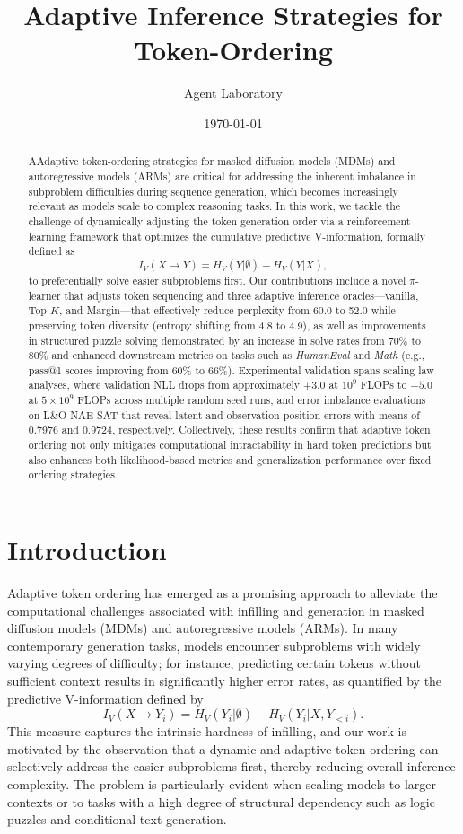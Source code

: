 \documentclass{article} %
\title{Adaptive Inference Strategies for Token-Ordering}
\author{Agent Laboratory}
\date{\today}
\begin{document}
\maketitle

\begin{abstract}
AAdaptive token-ordering strategies for masked diffusion models (MDMs) and autoregressive models (ARMs) are critical for addressing the inherent imbalance in subproblem difficulties during sequence generation, which becomes increasingly relevant as models scale to complex reasoning tasks. In this work, we tackle the challenge of dynamically adjusting the token generation order via a reinforcement learning framework that optimizes the cumulative predictive V-information, formally defined as
\[
I_V(X \to Y) = H_V(Y|\emptyset) - H_V(Y|X),
\]
to preferentially solve easier subproblems first. Our contributions include a novel \(\pi\)-learner that adjusts token sequencing and three adaptive inference oracles—vanilla, Top-\(K\), and Margin—that effectively reduce perplexity from 60.0 to 52.0 while preserving token diversity (entropy shifting from 4.8 to 4.9), as well as improvements in structured puzzle solving demonstrated by an increase in solve rates from 70\% to 80\% and enhanced downstream metrics on tasks such as \textit{HumanEval} and \textit{Math} (e.g., pass@1 scores improving from 60\% to 66\%). Experimental validation spans scaling law analyses, where validation NLL drops from approximately \(+3.0\) at \(10^9\) FLOPs to \(-5.0\) at \(5\times10^9\) FLOPs across multiple random seed runs, and error imbalance evaluations on L\&O-NAE-SAT that reveal latent and observation position errors with means of 0.7976 and 0.9724, respectively. Collectively, these results confirm that adaptive token ordering not only mitigates computational intractability in hard token predictions but also enhances both likelihood-based metrics and generalization performance over fixed ordering strategies.

\end{abstract}

\section{Introduction}
Adaptive token ordering has emerged as a promising approach to alleviate the computational challenges associated with infilling and generation in masked diffusion models (MDMs) and autoregressive models (ARMs). In many contemporary generation tasks, models encounter subproblems with widely varying degrees of difficulty; for instance, predicting certain tokens without sufficient context results in significantly higher error rates, as quantified by the predictive V-information defined by 
\[
I_V(X \to Y_i) = H_V(Y_i|\emptyset) - H_V(Y_i|X, Y_{<i}).
\]
This measure captures the intrinsic hardness of infilling, and our work is motivated by the observation that a dynamic and adaptive token ordering can selectively address the easier subproblems first, thereby reducing overall inference complexity. The problem is particularly evident when scaling models to larger contexts or to tasks with a high degree of structural dependency such as logic puzzles and conditional text generation.
\end{document}
